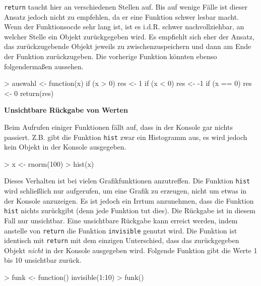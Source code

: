\documentclass[12pt, a4paper,twoside,openany,x11names,svgnames]{memoir}
\begin{document}
\texttt{return} taucht hier an verschiedenen Stellen auf. Bis auf wenige Fälle ist dieser Ansatz jedoch nicht zu empfehlen, da er eine Funktion schwer lesbar macht. Wenn der Funktionsocde sehr lang ist, ist es i.d.R. schwer nachvollziehbar, an welcher Stelle ein Objekt zurückgegeben wird. Es empfiehlt sich eher der Ansatz, das zurückzugebende Objekt jeweils zu zwischenzuspeichern und dann am Ende der Funktion zurückzugeben. Die vorherige Funktion könnten ebenso folgendermaßen aussehen.

\begin{Schunk}
\begin{Sinput}
> auswahl <- function(x) {
   if (x > 0)
     res <- 1
   if (x < 0)
     res <- -1
   if (x == 0)
     res <- 0
   return(res)
 }
\end{Sinput}
\end{Schunk}

\vspace*{5mm}

\textbf{Unsichtbare Rückgabe von Werten}

Beim Aufrufen einiger Funktionen fällt auf, dass in der Konsole gar nichts passiert. Z.B. gibt die Funktion \texttt{hist} zwar ein Histogramm aus, es wird jedoch kein Objekt in der Konsole ausgegeben.

\begin{Schunk}
\begin{Sinput}
> x <- rnorm(100)
> hist(x)
\end{Sinput}
\end{Schunk}

Dieses Verhalten ist bei vielen Grafikfunktionen anzutreffen. Die Funktion \texttt{hist} wird schließlich nur aufgerufen, um eine Grafik zu erzeugen, nicht um etwas in der Konsole anzuzeigen. Es ist jedoch ein Irrtum anzunehmen, dass die Funktion \texttt{hist} nichts zurückgibt (denn jede Funktion tut dies). Die Rückgabe ist in diesem Fall nur unsichtbar. Eine unsichtbare Rückgabe kann erreict werden, indem anstelle von \texttt{return} die Funktion \texttt{invisible} genutzt wird. Die Funktion ist identisch mit \texttt{return} mit dem einzigen Unterschied, dass das zurückgegeben Objekt \emph{nicht} in der Konsole ausgegeben wird. Folgende Funktion gibt die Werte 1 bis 10 unsichtbar zurück.


\begin{Schunk}
\begin{Sinput}
> funk <- function() {
   invisible(1:10)
 }
> funk()
\end{Sinput}
\end{Schunk}
\end{document}
